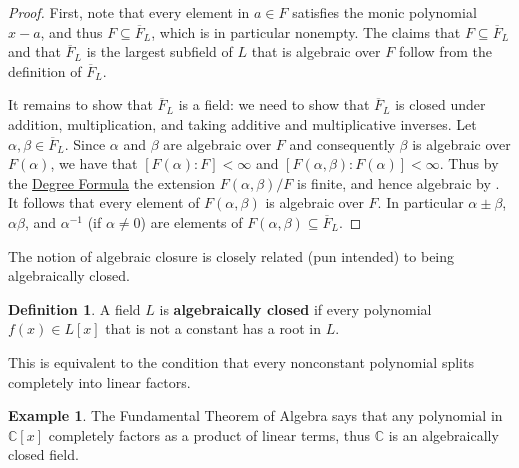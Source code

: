 \documentclass[12pt]{report}
\numberwithin{equation}{section}
\numberwithin{theorem}{chapter}
\theoremstyle{definition}
\newtheorem{definition}[theorem]{Definition}
\newtheorem{example}[theorem]{Example}
\newtheorem*{basic properties}{Basic Properties}
\newtheorem*{Important Remark}{Important Remark}
\newcommand{\df}[1]{{\bf #1}\index{#1}}
\newcommand{\C}{\mathbb{C}}
\begin{document}
\begin{proof}
First, note that every element in $a \in F$ satisfies the monic polynomial $x-a$, and thus $F \subseteq \overline{F}_L$, which is in particular nonempty. The claims that $F \subseteq \overline{F}_L$ and that $\overline{F}_L$ is the largest subfield of $L$ that is algebraic over $F$ follow from the definition of $\overline{F}_L$. 

It remains to show that $\overline{F}_L$ is a field: we need to show that $\overline{F}_L$ is closed under addition, multiplication, and taking additive and multiplicative inverses. Let $\alpha, \beta \in \overline{F}_L$. Since $\alpha$ and $\beta$ are algebraic over $F$ and consequently $\beta$ is algebraic over $F(\alpha)$, we have that $[F(\alpha):F]<\infty$ and $[F(\alpha,\beta):F(\alpha)]<\infty$. Thus by the \hyperref[deg formula]{Degree Formula} the extension $F(\alpha,\beta)/F$ is finite, and hence algebraic by . It follows that every element of $F(\alpha,\beta)$ is algebraic over $F$. In particular $\alpha\pm\beta$, $\alpha\beta$, and $\alpha^{-1}$ (if $\alpha \neq 0$) are elements of $F(\alpha,\beta) \subseteq \overline{F}_L$.
%
\end{proof}


The notion of algebraic closure is closely related (pun intended) to being algebraically closed.

\begin{definition} 
A field $L$ is \df{algebraically closed} if every polynomial $f(x) \in L[x]$ that is not a constant has a root in $L$. 
\end{definition}

This is equivalent to the condition that every nonconstant polynomial splits completely into linear factors.	
  
  
\begin{example}
The Fundamental Theorem of Algebra says that any polynomial in $\C[x]$ completely factors as a product of linear terms, thus $\C$ is an algebraically closed field.
\end{example}
\end{document}
